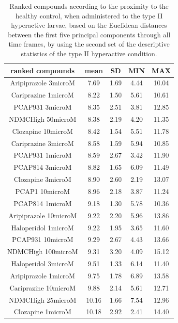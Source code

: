 \begin{table}[h!]\tiny
\centering
\caption{Ranked compounds according to the proximity to the healthy control, when administered to the type II hyperactive larvae, based on the Euclidean distances between the first five principal components through all time frames, by using the second set of the descriptive statistics of the type II hyperactive condition.}
\begin{tabular}{|c|c|c|c|c|}
\hline
ranked compounds             & mean & SD   & MIN  & MAX   \\ \hline
Aripiprazole 3microM  & 7.69  & 1.69 & 4.44 & 10.04 \\ \hline
Cariprazine 1microM   & 8.22  & 1.50  & 5.61 & 10.61 \\ \hline
PCAP931 3microM       & 8.35  & 2.51 & 3.81 & 12.85 \\ \hline
NDMCHigh 50microM     & 8.38  & 2.19 & 4.20  & 11.35 \\ \hline
Clozapine 10microM    & 8.42  & 1.54 & 5.51 & 11.78 \\ \hline
Cariprazine 3microM   & 8.58  & 1.59 & 5.94 & 10.85 \\ \hline
PCAP931 1microM       & 8.59  & 2.67 & 3.42 & 11.90  \\ \hline
PCAP814 3microM       & 8.82  & 1.65 & 6.09 & 11.49 \\ \hline
Clozapine 3microM     & 8.90   & 2.60  & 2.19 & 13.07 \\ \hline
PCAP1 10microM        & 8.96  & 2.18 & 3.87 & 11.24 \\ \hline
PCAP814 1microM       & 9.18  & 1.30  & 5.78 & 10.36 \\ \hline
Aripiprazole 10microM & 9.22  & 2.20  & 5.96 & 13.86 \\ \hline
Haloperidol 1microM   & 9.22  & 1.95 & 3.65 & 11.60  \\ \hline
PCAP931 10microM      & 9.29  & 2.67 & 4.43 & 13.66 \\ \hline
NDMCHigh 100microM    & 9.31  & 3.20  & 4.09 & 15.12 \\ \hline
Haloperidol 3microM   & 9.51  & 1.33 & 6.14 & 11.40  \\ \hline
Aripiprazole 1microM  & 9.75  & 1.78 & 6.89 & 13.58 \\ \hline
Cariprazine 10microM  & 9.88  & 2.14 & 5.61 & 12.71 \\ \hline
NDMCHigh 25microM     & 10.16 & 1.66 & 7.54 & 12.96 \\ \hline
Clozapine 1microM     & 10.18 & 2.92 & 2.41 & 14.40  \\ \hline

\end{tabular}
\end{table}
